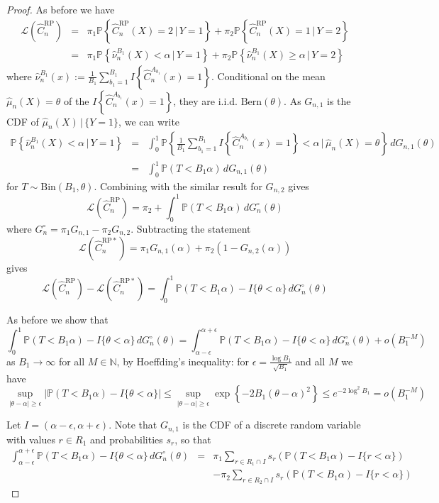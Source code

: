 \documentclass[ejs,preprint]{imsart}
\newcommand\crpnhat{\hat{C}_{n}^{\mathrm{RP}}}
\newcommand\crpnhatstar{\hat{C}_{n}^{\mathrm{RP*}}}
\newcommand\risk{\mathcal{L}}
\begin{document}
\begin{proof}
As before we have 
\begin{eqnarray*}
\risk(\crpnhat) & = & \pi_{1}\mathbb{P}\left\{ \crpnhat(X)=2\,|\,Y=1\right\} +\pi_{2}\mathbb{P}\left\{ \crpnhat(X)=1\,|\,Y=2\right\} \\
 & = & \pi_{1}\mathbb{P}\left\{ \hat{\nu}_{n}^{B_{1}}(X)<\alpha\,|\,Y=1\right\} +\pi_{2}\mathbb{P}\left\{ \hat{\nu}_{n}^{B_{1}}(X)\geq\alpha\,|\,Y=2\right\} 
\end{eqnarray*}
 where $\hat{\nu}_{n}^{B_{1}}(x):=\frac{1}{B_{1}}\sum_{b_{1}=1}^{B_{1}}I\left\{ \hat{C}_{n}^{A_{b_{1}}}(x)=1\right\} $.
Conditional on the mean $\hat{\mu}_{n}(X)=\theta$ of the $I\left\{ \hat{C}_{n}^{A_{b_{1}}}(x)=1\right\} $,
they are i.i.d. $\mathrm{Bern}(\theta)$. As $G_{n,1}$ is the CDF
of $\hat{\mu}_{n}(X)\,|\,\{Y=1\}$, we can write 
\begin{eqnarray*}
\mathbb{P}\left\{ \hat{\nu}_{n}^{B_{1}}(X)<\alpha\,|\,Y=1\right\}  & = & \int_{0}^{1}\!\mathbb{P}\left\{ \frac{1}{B_{1}}\sum_{b_{1}=1}^{B_{1}}I\left\{ \hat{C}_{n}^{A_{b_{1}}}(x)=1\right\} <\alpha\,\bigg|\,\hat{\mu}_{n}(X)=\theta\right\} \,dG_{n,1}(\theta)\\
 & = & \int_{0}^{1}\!\mathbb{P}(T<B_{1}\alpha)\,dG_{n,1}(\theta)
\end{eqnarray*}
 for $T\sim\mathrm{Bin}(B_{1},\theta)$. Combining with the similar
result for $G_{n,2}$ gives 
\[
\risk(\crpnhat)=\pi_{2}+\int_{0}^{1}\!\mathbb{P}(T<B_{1}\alpha)\,dG_{n}^{\circ}(\theta)
\]
 where $G_{n}^{\circ}=\pi_{1}G_{n,1}-\pi_{2}G_{n,2}$. Subtracting the statement 
\[
\risk\left(\crpnhatstar\right)=\pi_{1}G_{n,1}(\alpha)+\pi_{2}\left(1-G_{n,2}(\alpha)\right)
\]
 gives 
\[
\risk\left(\crpnhat\right)-\risk\left(\crpnhatstar\right)=\int_{0}^{1}\!\mathbb{P}(T<B_{1}\alpha)-I\{\theta<\alpha\}\,dG_{n}^{\circ}(\theta)
\]


As before we show that 
\[
\int_{0}^{1}\!\mathbb{P}(T<B_{1}\alpha)-I\{\theta<\alpha\}\,dG_{n}^{\circ}(\theta)=\int_{\alpha-\epsilon}^{\alpha+\epsilon}\!\mathbb{P}(T<B_{1}\alpha)-I\{\theta<\alpha\}\,dG_{n}^{\circ}(\theta)+o(B_{1}^{-M})
\]
 as $B_{1}\to\infty$ for all $M\in\mathbb{N}$, by Hoeffding's inequality:
for $\epsilon=\frac{\log B_{1}}{\sqrt{B_{1}}}$ and all $M$ we have
\[
\sup_{|\theta-\alpha|\geq\epsilon}\left|\mathbb{P}(T<B_{1}\alpha)-I\{\theta<\alpha\}\right|\leq\sup_{|\theta-\alpha|\geq\epsilon}\exp\left\{ -2B_{1}(\theta-\alpha)^{2}\right\} \leq e^{-2\log^{2}B_{1}}=o(B_{1}^{-M})
\]


Let $I=(\alpha-\epsilon,\alpha+\epsilon)$. Note that $G_{n,1}$ is
the CDF of a discrete random variable with values $r\in R_{1}$ and
probabilities $s_{r}$, so that 
\begin{eqnarray*}
\int_{\alpha-\epsilon}^{\alpha+\epsilon}\!\mathbb{P}(T<B_{1}\alpha)-I\{\theta<\alpha\}\,dG_{n}^{\circ}(\theta) & = & \pi_{1}\sum_{r\in R_{1}\cap I}s_{r}\left(\mathbb{P}(T<B_{1}\alpha)-I\{r<\alpha\}\right)\\
 &  & -\pi_{2}\sum_{r\in R_{2}\cap I}s_{r}\left(\mathbb{P}(T<B_{1}\alpha)-I\{r<\alpha\}\right)
\end{eqnarray*}



\end{proof}
\end{document}
